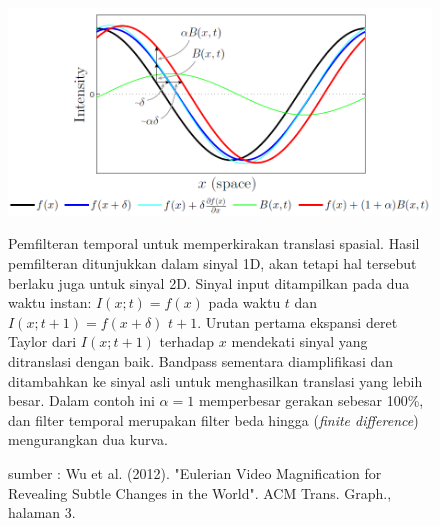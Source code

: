\begin{figure}[ht]
	\vspace{0.5em}
	\centering
	\includegraphics[width=\textwidth]{Sinus}
	\caption[Pemfilteran temporal untuk memperkirakan translasi spasial]{Pemfilteran temporal untuk memperkirakan translasi spasial. Hasil pemfilteran ditunjukkan dalam sinyal 1D, akan tetapi hal tersebut berlaku juga untuk sinyal 2D. Sinyal input ditampilkan pada dua waktu instan: \(I(x; t) = f(x)\) pada waktu \(t\) dan \(I(x; t+1) = f(x + \delta)\) \(t+1\). Urutan pertama ekspansi deret Taylor dari \(I(x; t+1)\) terhadap \(x\) mendekati sinyal yang ditranslasi dengan baik. Bandpass sementara diamplifikasi dan ditambahkan ke sinyal asli untuk menghasilkan translasi yang lebih besar. Dalam contoh ini \(\alpha=1\) memperbesar gerakan sebesar 100\%, dan filter temporal merupakan filter beda hingga (\textit{finite difference}) mengurangkan dua kurva.}
	\caption*{sumber : Wu et al. (2012). "Eulerian Video Magnification for Revealing Subtle Changes in the World". ACM Trans. Graph., halaman 3.}
	\label{fig:Sinus}   
\end{figure}

